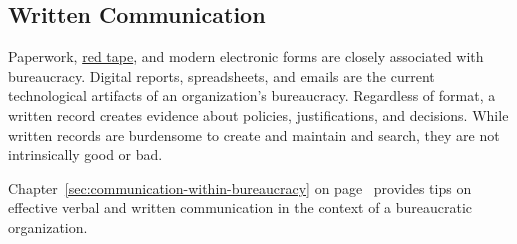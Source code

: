\subsection*{Written Communication\label{sec:written-communication}}

Paperwork,  \href{https://en.wikipedia.org/wiki/Red_tape}{red tape},
and modern electronic forms are closely associated with bureaucracy.
Digital reports, spreadsheets, and emails are the current technological artifacts of an organization's bureaucracy. Regardless of format, a written record creates evidence about policies, justifications, and decisions. %
While written records are burdensome to create and maintain and search, they are not intrinsically good or bad. 

Chapter~\ref{sec:communication-within-bureaucracy} on 
page~\pageref{sec:communication-within-bureaucracy} 
provides tips on effective verbal and written communication in the context of a bureaucratic organization. 